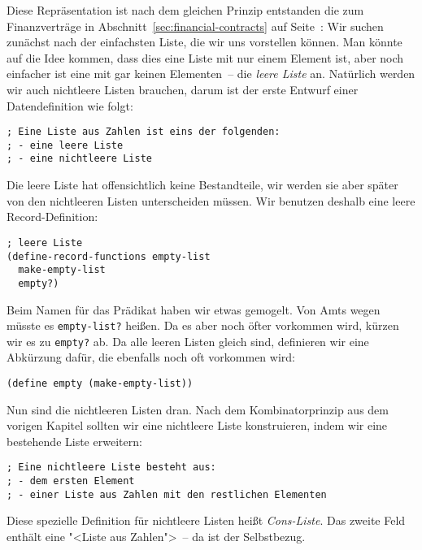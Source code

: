 Diese Repräsentation ist nach dem gleichen Prinzip entstanden die zum
Finanzverträge in Abschnitt~\ref{sec:financial-contracts} auf
Seite~\pageref{sec:financial-contracts}: Wir suchen zunächst nach der
einfachsten Liste, die wir uns vorstellen können.  Man könnte auf die
Idee kommen, dass dies eine Liste mit nur einem Element ist, aber noch
einfacher ist eine mit gar keinen Elementen~-- die \textit{leere
  Liste} an.  Natürlich werden
wir auch nichtleere Listen brauchen, darum ist der erste Entwurf
einer Datendefinition wie folgt:
%
\begin{lstlisting}
; Eine Liste aus Zahlen ist eins der folgenden:
; - eine leere Liste
; - eine nichtleere Liste
\end{lstlisting}
%
Die leere Liste hat offensichtlich keine Bestandteile, wir werden sie
aber später von den nichtleeren Listen unterscheiden müssen.  Wir
benutzen deshalb eine leere Record-Definition:
%
\begin{lstlisting}
; leere Liste
(define-record-functions empty-list
  make-empty-list
  empty?)
\end{lstlisting}
%
Beim Namen für das Prädikat haben wir etwas gemogelt.  Von Amts wegen
müsste es \lstinline{empty-list?} heißen.  Da es aber noch öfter
vorkommen wird, kürzen wir es zu \lstinline{empty?} ab. Da alle leeren
Listen gleich sind, definieren wir eine Abkürzung dafür, die ebenfalls
noch oft vorkommen wird:
%
\begin{lstlisting}
(define empty (make-empty-list))
\end{lstlisting}
%
Nun sind die nichtleeren Listen dran.  Nach dem Kombinatorprinzip aus dem
vorigen Kapitel sollten wir eine nichtleere Liste konstruieren, indem
wir eine bestehende Liste erweitern:
%
\begin{lstlisting}
; Eine nichtleere Liste besteht aus:
; - dem ersten Element
; - einer Liste aus Zahlen mit den restlichen Elementen
\end{lstlisting}
%
Diese spezielle Definition für nichtleere Listen heißt
\textit{Cons-Liste}.  Das zweite Feld enthält
eine "<Liste aus Zahlen">~-- da ist der Selbstbezug.


